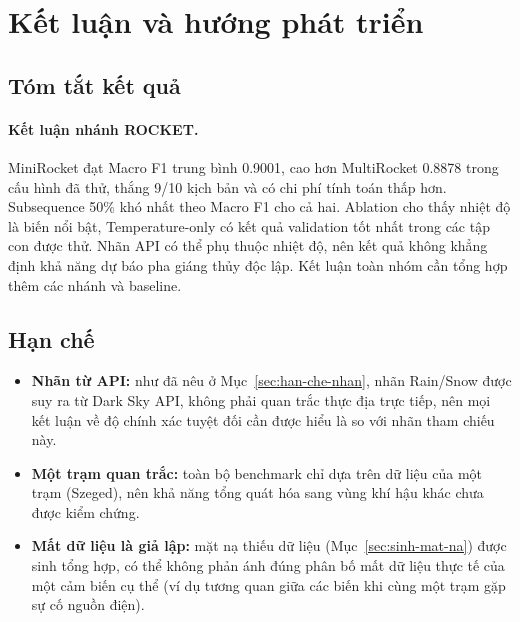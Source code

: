 \section{Kết luận và hướng phát triển}
\label{sec:ket-luan}

\subsection{Tóm tắt kết quả}
\label{sec:tom-tat-ket-qua}


\paragraph{Kết luận nhánh ROCKET.} MiniRocket đạt Macro F1 trung bình 0.9001, cao hơn MultiRocket 0.8878 trong cấu hình đã thử, thắng 9/10 kịch bản và có chi phí tính toán thấp hơn. Subsequence 50\% khó nhất theo Macro F1 cho cả hai. Ablation cho thấy nhiệt độ là biến nổi bật, Temperature-only có kết quả validation tốt nhất trong các tập con được thử. Nhãn API có thể phụ thuộc nhiệt độ, nên kết quả không khẳng định khả năng dự báo pha giáng thủy độc lập. Kết luận toàn nhóm cần tổng hợp thêm các nhánh và baseline.

\subsection{Hạn chế}
\label{sec:han-che}

\begin{itemize}
  \item \textbf{Nhãn từ API:} như đã nêu ở Mục~\ref{sec:han-che-nhan}, nhãn Rain/Snow
        được suy ra từ Dark Sky API, không phải quan trắc thực địa trực tiếp, nên mọi kết
        luận về độ chính xác tuyệt đối cần được hiểu là so với nhãn tham chiếu này.
  \item \textbf{Một trạm quan trắc:} toàn bộ benchmark chỉ dựa trên dữ liệu của một trạm
        (Szeged), nên khả năng tổng quát hóa sang vùng khí hậu khác chưa được kiểm chứng.
  \item \textbf{Mất dữ liệu là giả lập:} mặt nạ thiếu dữ liệu (Mục~\ref{sec:sinh-mat-na})
        được sinh tổng hợp, có thể không phản ánh đúng phân bố mất dữ liệu thực tế của
        một cảm biến cụ thể (ví dụ tương quan giữa các biến khi cùng một trạm gặp sự cố
        nguồn điện).
\end{itemize}

